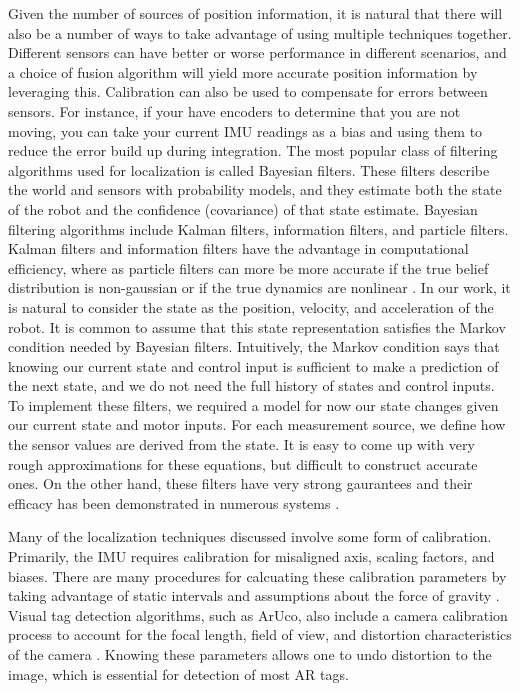 \documentclass{article}
\begin{document}
    Given the number of sources of position information, it is natural that there will also be a number of ways to take advantage of using multiple techniques together. Different sensors can have better or worse performance in different scenarios, and a choice of fusion algorithm will yield more accurate position information by leveraging this. Calibration can also be used to compensate for errors between sensors. For instance, if your have encoders to determine that you are not moving, you can take your current IMU readings as a bias and using them to reduce the error build up during integration. The most popular class of filtering algorithms used for localization is called Bayesian filters. These filters describe the world and sensors with probability models, and they estimate both the state of the robot and the confidence (covariance) of that state estimate. Bayesian filtering algorithms include Kalman filters, information filters, and particle filters. Kalman filters and information filters have the advantage in computational efficiency, where as particle filters can more be more accurate if the true belief distribution is non-gaussian or if the true dynamics are nonlinear \cite{thrun_probabilistic_2005}. In our work, it is natural to consider the state as the position, velocity, and acceleration of the robot. It is common to assume that this state representation satisfies the Markov condition needed by Bayesian filters. Intuitively, the Markov condition says that knowing our current state and control input is sufficient to make a prediction of the next state, and we do not need the full history of states and control inputs. To implement these filters, we required a model for now our state changes given our current state and motor inputs. For each measurement source, we define how the sensor values are derived from the state. It is easy to come up with very rough approximations for these equations, but difficult to construct accurate ones. On the other hand, these filters have very strong gaurantees and their efficacy has been demonstrated in numerous systems \cite{chui_kalman_1991}\cite{digiampaolo_mobile_2014}\cite{mirzaei_kalman_2008}\cite{nasa_kalman_1999}\cite{saab_standalone_2011}\cite{teslic_ekf-based_2011}\cite{marin_multi_2013}.

    Many of the localization techniques discussed involve some form of calibration. Primarily, the IMU requires calibration for misaligned axis, scaling factors, and biases. There are many procedures for calcuating these calibration parameters by taking advantage of static intervals and assumptions about the force of gravity \cite{lupton_visual-inertial-aided_2012}\cite{lee_test_2011}\cite{tedaldi_robust_2014}. Visual tag detection algorithms, such as ArUco, also include a camera calibration process to account for the focal length, field of view, and distortion characteristics of the camera \cite{itseez_calibration_2017}. Knowing these parameters allows one to undo distortion to the image, which is essential for detection of most AR tags.
\end{document}
